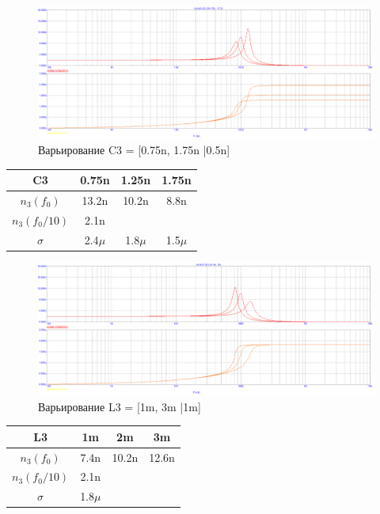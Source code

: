 \documentclass[a4paper, 12pt]{article}%
\begin{document}
\begin{enumerate}
\begin{figure}[h!]
    \centering
    \includegraphics[scale=0.3]{images/mod3_3_2_2.png}
    \caption{Варьирование C3 = [0.75n, 1.75n |0.5n]}
    \label{fig:m3322}
\end{figure}

\begin{center}
\begin{tabular}{|c|c|c|c|}
\hline
    C3 & 0.75n & 1.25n & 1.75n\\ \hline
    $n_3(f_0)$ & 13.2n & 10.2n & 8.8n\\ \hline
    $n_3(f_0/10)$ & 2.1n &  & \\ \hline
    $\sigma$ & 2.4$\mu$ & 1.8$\mu$ & 1.5$\mu$ \\ \hline
\end{tabular}
\end{center}

\begin{figure}[h!]
    \centering
    \includegraphics[scale=0.3]{images/mod3_3_2_3.png}
    \caption{Варьирование L3 = [1m, 3m |1m]}
    \label{fig:m3323}
\end{figure}

\begin{center}
\begin{tabular}{|c|c|c|c|}
\hline
    L3 & 1m & 2m & 3m\\ \hline
    $n_3(f_0)$ & 7.4n & 10.2n & 12.6n\\ \hline
    $n_3(f_0/10)$ & 2.1n &  & \\ \hline
    $\sigma$ & 1.8$\mu$ &  & \\ \hline
\end{tabular}
\end{center}

\end{enumerate}
\end{document}
